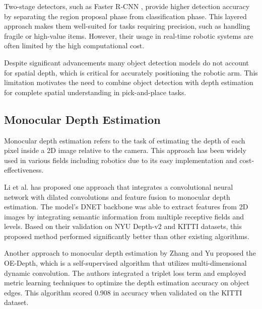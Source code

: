 \vspace{10}

Two-stage detectors, such as Faster R-CNN \cite{ren2016fasterr-cnn}, provide higher detection accuracy by separating the region proposal phase from classification phase. This layered approach makes them well-suited for tasks requiring precision, such as handling fragile or high-value items. However, their usage in real-time robotic systems are often limited by the high computational cost.

\vspace{10}

Despite significant advancements many object detection models do not account for spatial depth, which is critical for accurately positioning the robotic arm. This limitation motivates the need to combine object detection with depth estimation for complete spatial understanding in pick-and-place tasks.

\subsection{Monocular Depth Estimation}
Monocular depth estimation refers to the task of estimating the depth of each pixel inside a 2D image relative to the camera. This approach has been widely used in various fields including robotics due to its easy implementation and cost-effectiveness.

\vspace{10pt}

Li et al. \cite{huiyi_li_2024} has proposed one approach that integrates a convolutional neural network with dilated convolutions and feature fusion to monocular depth estimation. The model’s DNET backbone was able to extract features from 2D images by integrating semantic information from multiple receptive fields and levels. Based on their validation on NYU Depth-v2 and KITTI datasets, this proposed method performed significantly better than other existing algorithms.

\vspace{10pt}

Another approach to monocular depth estimation by Zhang and Yu \cite{rui_zhang_2024} proposed the OE-Depth, which is a self-supervised algorithm that utilizes multi-dimensional dynamic convolution. The authors integrated a triplet loss term and employed metric learning techniques to optimize the depth estimation accuracy on object edges. This algorithm scored 0.908 in accuracy when validated on the KITTI dataset.

